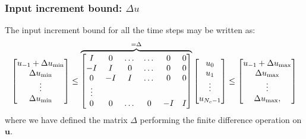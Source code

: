 \documentclass[a4paper,12pt,fleqn]{article}
\newcommand{\varuvec}{\mathbf{u}}
\newcommand{\Nc}{{N_c}}
\begin{document}
\subsubsection{Input increment bound: $\Delta u$}
The input increment bound for all the time steps may be written as:
\begin{equation}
\begin{bmatrix}
u_{-1} +\Delta u_{\rm min}\\
\Delta u_{\rm min}\\
\vdots\\
\Delta u_{\rm min}\\
\end{bmatrix} \leq 
\overbrace{
\begin{bmatrix}
  I  &  0 & \dots & \dots  & 0 & 0\\
 -I  &  I &  0    & \dots  & 0 & 0\\
  0  & -I &  I    & \dots  & 0 & 0\\
	\vdots\\
	0  &  0 & \dots & 0      &-I & I\\    
\end{bmatrix}
}^{={\Delta}}
\begin{bmatrix}
u_0\\
u_1\\
\vdots\\
u_{\Nc-1}\\
\end{bmatrix}
\leq 
\begin{bmatrix}
u_{-1} +\Delta u_{\rm max}\\
\Delta u_{\rm max}\\
\vdots\\
\Delta u_{\rm max},\\
\end{bmatrix}
\end{equation}
where we have defined the matrix $\Delta$ performing the finite difference operation on $\varuvec$.
\end{document}
